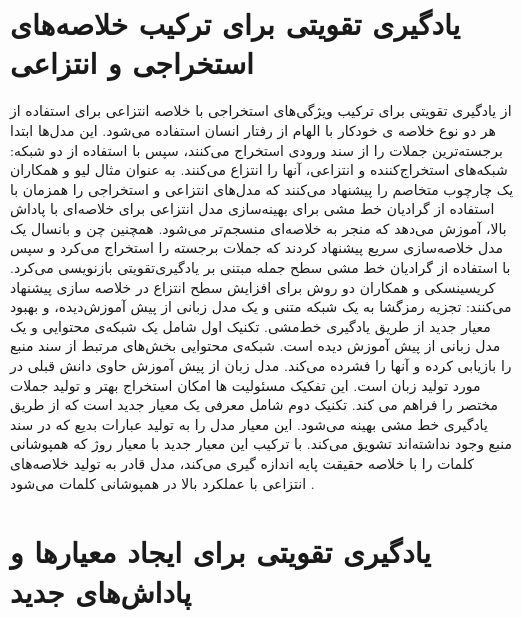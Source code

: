 \section{یادگیری تقویتی برای ترکیب خلاصه‌های استخراجی و انتزاعی} 
از یادگیری تقویتی برای ترکیب ویژگی‌های استخراجی با خلاصه انتزاعی برای استفاده از هر دو نوع خلاصه ی خودکار با الهام از رفتار انسان استفاده می‌شود. این مدل‌ها ابتدا برجسته‌ترین جملات را از سند ورودی استخراج می‌کنند، سپس با استفاده از دو شبکه: شبکه‌های استخراج‌کننده و انتزاعی، آنها را انتزاع می‌کنند. به عنوان مثال لیو
و همکاران یک چارچوب متخاصم را پیشنهاد می‌کنند که مدل‌های انتزاعی و استخراجی را همزمان با استفاده از گرادیان خط ‌مشی برای بهینه‌سازی مدل انتزاعی برای خلاصه‌ای با پاداش بالا، آموزش می‌دهد که منجر به خلاصه‌ای منسجم‌تر می‌شود\cite{liu2018generative}.
همچنین چن و بانسال
یک مدل خلاصه‌سازی سریع پیشنهاد کردند که جملات برجسته را استخراج می‌کرد و سپس با استفاده از گرادیان خط مشی سطح جمله مبتنی بر یادگیری‌تقویتی بازنویسی می‌کرد\cite{chen2018fast}.
کریسینسکی 
و همکاران  دو روش برای افزایش سطح انتزاع در خلاصه سازی  پیشنهاد می‌کنند: تجزیه رمزگشا به یک شبکه متنی و یک مدل زبانی از پیش آموزش‌دیده، و بهبود معیار جدید از طریق یادگیری خط‌مشی.
تکنیک اول شامل یک شبکه‌ی محتوایی
و یک مدل زبانی از پیش آموزش دیده است. شبکه‌ی محتوایی  بخش‌های مرتبط از سند منبع را بازیابی کرده و آنها را فشرده می‌کند. مدل زبان از پیش آموزش حاوی دانش قبلی در مورد تولید زبان است. این تفکیک مسئولیت ها امکان استخراج بهتر و تولید جملات مختصر را فراهم می کند.
تکنیک دوم شامل معرفی یک معیار جدید است که از طریق یادگیری خط مشی بهینه می‌شود. این معیار مدل را به تولید عبارات بدیع که در سند   منبع وجود نداشته‌اند تشویق می‌کند. با ترکیب این معیار جدید با معیار روژ که همپوشانی کلمات را با خلاصه حقیقت پایه اندازه گیری می‌کند، مدل قادر به تولید خلاصه‌های انتزاعی با عملکرد بالا در همپوشانی کلمات می‌شود \cite{kryscinski-etal-2018-improving}.

\section{یادگیری تقویتی  برای ایجاد معیارها و پاداش‌های جدید}

